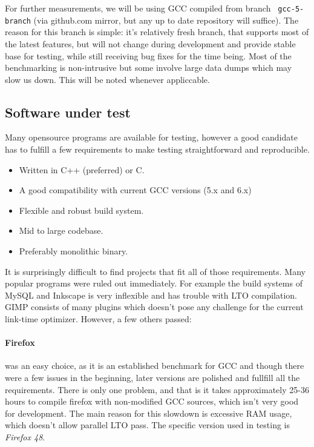 For further measurements, we will be using GCC compiled from branch {\tt
gcc-5-branch} (via github.com mirror, but any up to date repository will
suffice). The reason for this branch is simple: it's relatively fresh branch,
that supports most of the latest features, but will not change during
development and provide stable base for testing, while still receiving bug fixes
for the time being. Most of the benchmarking is non-intrusive but some involve
large data dumps which may slow us down. This will be noted whenever appliccable.


\subsection{Software under test}

Many opensource programs are available for testing, however a good candidate has
to fulfill a few requirements to make testing straightforward and reproducible.

\begin{itemize}
	\item Written in C++ (preferred) or C.
	\item A good compatibility with current GCC versions (5.x and 6.x)
	\item Flexible and robust build system.
	\item Mid to large codebase.
	\item Preferably monolithic binary.
\end{itemize}

It is surprisingly difficult to find projects that fit all of those
requirements. Many popular programs were ruled out immediately. For example the
build systems of MySQL and Inkscape is very inflexible and has trouble with LTO
compilation. GIMP consists of many plugins which doesn't pose any challenge for
the current link-time optimizer. However, a few others passed:

\paragraph{Firefox} was an easy choice, as it is an established benchmark for GCC
and though there were a few issues in the beginning, later versions are polished
and fullfill all the requirements. There is only one problem, and that is it
takes approximately 25-36 hours to compile firefox with non-modified GCC
sources, which isn't very good for development. The main reason for this
slowdown is excessive RAM usage, which doesn't allow parallel LTO pass.  
The specific version used in testing is {\it Firefox 48}.

